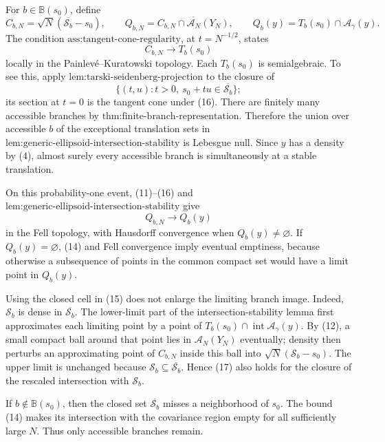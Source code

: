 For \(b\in\mathbb B(s_0)\), define
\[
 C_{b,N}=\sqrt N(\overline{\mathcal S_b}-s_0),
 \qquad
 Q_{b,N}=\overline{C_{b,N}\cap\mathcal A_N(Y_N)},
 \qquad
 Q_b(y)=T_b(s_0)\cap\mathcal A_\gamma(y).
 \tag{15}
\]
The condition \(\text{ass:tangent-cone-regularity}\), at \(t=N^{-1/2}\), states
\[
 C_{b,N}\longrightarrow T_b(s_0)
 \tag{16}
\]
locally in the Painlev\'e--Kuratowski topology. Each \(T_b(s_0)\) is semialgebraic. To see this, apply \(\text{lem:tarski-seidenberg-projection}\) to the closure of
\[
 \{(t,u):t>0,\ s_0+t u\in\overline{\mathcal S_b}\};
\]
its section at \(t=0\) is the tangent cone under (16). There are finitely many accessible branches by \(\text{thm:finite-branch-representation}\). Therefore the union over accessible \(b\) of the exceptional translation sets in \(\text{lem:generic-ellipsoid-intersection-stability}\) is Lebesgue null. Since \(y\) has a density by (4), almost surely every accessible branch is simultaneously at a stable translation.

On this probability-one event, (11)--(16) and \(\text{lem:generic-ellipsoid-intersection-stability}\) give
\[
 Q_{b,N}\longrightarrow Q_b(y)
 \tag{17}
\]
in the Fell topology, with Hausdorff convergence when \(Q_b(y)\ne\varnothing\). If \(Q_b(y)=\varnothing\), (14) and Fell convergence imply eventual emptiness, because otherwise a subsequence of points in the common compact set would have a limit point in \(Q_b(y)\).

Using the closed cell in (15) does not enlarge the limiting branch image. Indeed, \(\mathcal S_b\) is dense in \(\overline{\mathcal S_b}\). The lower-limit part of the intersection-stability lemma first approximates each limiting point by a point of \(T_b(s_0)\cap\operatorname{int}\mathcal A_\gamma(y)\). By (12), a small compact ball around that point lies in \(\mathcal A_N(Y_N)\) eventually; density then perturbs an approximating point of \(C_{b,N}\) inside this ball into \(\sqrt N(\mathcal S_b-s_0)\). The upper limit is unchanged because \(\mathcal S_b\subseteq\overline{\mathcal S_b}\). Hence (17) also holds for the closure of the rescaled intersection with \(\mathcal S_b\).

If \(b\notin\mathbb B(s_0)\), then the closed set \(\overline{\mathcal S_b}\) misses a neighborhood of \(s_0\). The bound (14) makes its intersection with the covariance region empty for all sufficiently large \(N\). Thus only accessible branches remain.

